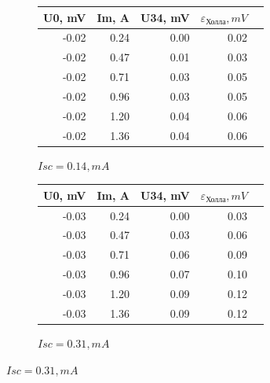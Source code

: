 \documentclass[a4paper, 12pt]{article}
\begin{document}
\begin{figure}[ht]
    \centering

    \begin{subfigure}[b]{0.45\textwidth}
        \centering
        \begin{tabular}{|r|r|r|r|r|}
        \toprule
        U0, mV & Im, A & U34, mV & $\varepsilon_\text{Холла}, mV$ \\
        \midrule
        -0.02 & 0.24 & 0.00 & 0.02 \\
        -0.02 & 0.47 & 0.01 & 0.03 \\
        -0.02 & 0.71 & 0.03 & 0.05 \\
        -0.02 & 0.96 & 0.03 & 0.05 \\
        -0.02 & 1.20 & 0.04 & 0.06 \\
        -0.02 & 1.36 & 0.04 & 0.06 \\
        \bottomrule
        \end{tabular}
        \caption{$Isc = 0.14, mA$}
    \end{subfigure}
    \hfill
    \begin{subfigure}[b]{0.45\textwidth}
        \centering
        \begin{tabular}{|r|r|r|r|r|}
        \toprule
        U0, mV & Im, A & U34, mV & $\varepsilon_\text{Холла}, mV$ \\
        \midrule
        -0.03 & 0.24 & 0.00 & 0.03 \\
        -0.03 & 0.47 & 0.03 & 0.06 \\
        -0.03 & 0.71 & 0.06 & 0.09 \\
        -0.03 & 0.96 & 0.07 & 0.10 \\
        -0.03 & 1.20 & 0.09 & 0.12 \\
        -0.03 & 1.36 & 0.09 & 0.12 \\
        \bottomrule
        \end{tabular}
        \caption{$Isc = 0.31, mA$}
    \end{subfigure}


\end{figure}
\end{document}
